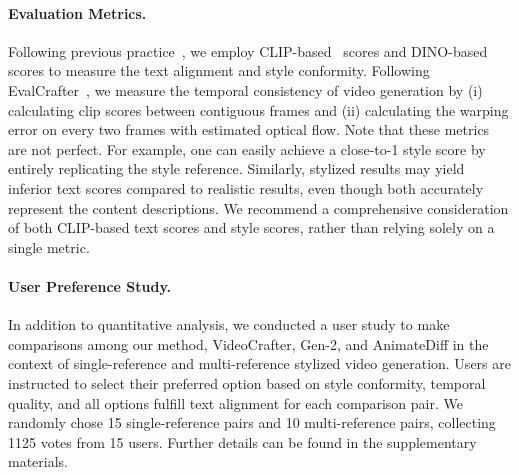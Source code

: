 
\paragraph{Evaluation Metrics.}
\label{sec:eval_metrics}
Following previous practice~\cite{zhang2023inversion, sohn2023styledrop, wang2023styleadapter}, we employ CLIP-based~\cite{radford2021learning} scores and DINO-based~\cite{caron2021emerging} scores to measure the text alignment and style conformity. Following EvalCrafter~\cite{liu2023evalcrafter}, we measure the temporal consistency of video generation by (i) calculating clip scores between contiguous frames and (ii) calculating the warping error on every two frames with estimated optical flow. 
Note that these metrics are not perfect. For example, one can easily achieve a close-to-1 style score by entirely replicating the style reference. Similarly, stylized results may yield inferior text scores compared to realistic results, even though both accurately represent the content descriptions. We recommend a comprehensive consideration of both CLIP-based text scores and style scores, rather than relying solely on a single metric.

\paragraph{User Preference Study.}
In addition to quantitative analysis, we conducted a user study to make comparisons among our method, VideoCrafter, Gen-2, and AnimateDiff in the context of single-reference and multi-reference stylized video generation. Users are instructed to select their preferred option based on style conformity, temporal quality, and all options fulfill text alignment for each comparison pair. We randomly chose 15 single-reference pairs and 10 multi-reference pairs, collecting 1125 votes from 15 users. 
Further details can be found in the supplementary materials.

